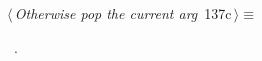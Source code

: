 \documentclass[a4paper]{report}
\begin{document}
\begin{flushleft} \small
\begin{minipage}{\linewidth}\label{scrap299}\raggedright\small
{} $\langle\,${\it Otherwise pop the current arg}\nobreak\ {\footnotesize {137c}}$\,\rangle\equiv$
\vspace{-1ex}
\begin{list}{}{} \item
\mbox{}\verb@} else {@\\
\mbox{}\verb@   mgr->a = a->old;@\\
\mbox{}\verb@   free(a);@\\
\mbox{}\verb@}@{\NWsep}
\end{list}
\vspace{-1.5ex}
\footnotesize
\begin{list}{}{\setlength{\itemsep}{-\parsep}\setlength{\itemindent}{-\leftmargin}}
\item \NWtxtMacroRefIn\ .

\item{}
\end{list}
\end{minipage}\vspace{4ex}
\end{flushleft}
\end{document}
